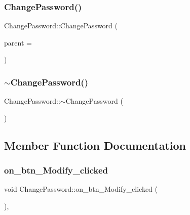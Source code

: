 \subsubsection{\texorpdfstring{ChangePassword()}{ChangePassword()}}
{\footnotesize\ttfamily Change\+Password\+::\+Change\+Password (\begin{DoxyParamCaption}\item[{Q\+Widget $\ast$}]{parent = {} }\end{DoxyParamCaption})\hspace{0.3cm}{\ttfamily [explicit]}}

\mbox{\label{class_change_password_a3404eee74b7fefaf62698f71c53f9fca}} 
\subsubsection{\texorpdfstring{$\sim$ChangePassword()}{~ChangePassword()}}
{\footnotesize\ttfamily Change\+Password\+::$\sim$\+Change\+Password (\begin{DoxyParamCaption}{ }\end{DoxyParamCaption})}



\subsection{Member Function Documentation}
\mbox{\label{class_change_password_a818333a3c3fbeb476314f5624016ba1e}} 
\subsubsection{\texorpdfstring{on\_btn\_Modify\_clicked}{on\_btn\_Modify\_clicked}}
{\footnotesize\ttfamily void Change\+Password\+::on\+\_\+btn\+\_\+\+Modify\+\_\+clicked (\begin{DoxyParamCaption}{ }\end{DoxyParamCaption})\hspace{0.3cm}{\ttfamily [private]}, {\ttfamily [slot]}}



